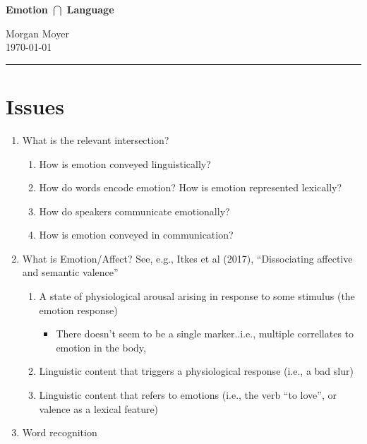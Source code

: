 \documentclass[12pt,letterpaper,table,svgnames,dvipsnames]{article}
\begin{document}
\thispagestyle{empty} %
\noindent \Large\textbf{Emotion $\bm{\bigcap}$ Language}
\bigskip

\large 
\noindent Morgan Moyer \\ 
\normalsize
\noindent \today \\

\hrule



\bigskip 



\section{Issues}
\begin{enumerate}[noitemsep]
    \item What is the relevant intersection?
        \begin{enumerate}[noitemsep]
            \item How is emotion conveyed linguistically?
            \item How do words encode emotion? How is emotion represented lexically?
            \item How do speakers communicate emotionally?
            \item How is emotion conveyed in communication?
        \end{enumerate}
    \item What is Emotion/Affect?
        See, e.g., Itkes et al (2017), ``Dissociating affective and semantic valence''
    
        \begin{enumerate}[noitemsep]
            \item A state of physiological arousal arising in response to some stimulus (the emotion response)
                \begin{itemize}[noitemsep]
                    \item There doesn't seem to be a single marker..i.e., multiple correllates to emotion in the body, 
                \end{itemize}
                
            \item Linguistic content that triggers a physiological response (i.e., a bad slur)
            
            \item Linguistic content that refers to emotions (i.e., the verb ``to love'', or valence as a lexical feature)
        \end{enumerate}
    
    \item Word recognition

\end{enumerate}
\end{document}
